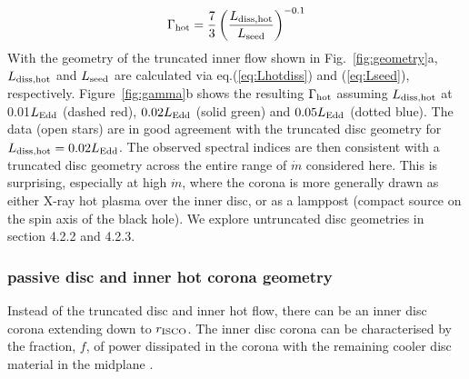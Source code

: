 \documentclass[a4paper,fleqn,usenatbib]{mnras}
\begin{document}
\begin{equation} 
\Gamma_{\rm hot}=\frac{7}{3}\left(\frac{L_{\rm diss, hot}}{L_{\rm  seed}}\right)^{-0.1}
\label{eq:gamma} 
\end{equation} 
With the geometry of
the truncated inner flow shown in Fig.~\ref{fig:geometry}a, $L_{\rm
  diss,hot}$ and $L_{\rm seed}$ are calculated via
eq.(\ref{eq:Lhotdiss}) and (\ref{eq:Lseed}), respectively.
Figure~\ref{fig:gamma}b shows the resulting $\Gamma_{\rm hot}$
assuming $L_{\rm diss, hot}$ at 0.01$L_{\rm Edd}$ (dashed red),
$0.02L_{\rm Edd}$ (solid green) and $0.05L_{\rm Edd}$
(dotted blue). The data (open stars) are in good agreement
with the truncated disc geometry for $L_{\rm diss, hot}=0.02L_{\rm
  Edd}$.
The observed spectral indices are then consistent with a truncated
disc geometry across the entire range of $\dot{m}$ considered here. 
This is surprising, especially at high $\dot{m}$, where the corona is more generally drawn as
either X-ray hot plasma over the inner disc, or as a lamppost (compact
source on the spin axis of the black hole). 
We explore untruncated disc geometries in section 4.2.2 and 4.2.3. 

\subsubsection{passive disc  and inner hot corona geometry}
Instead of the truncated disc and inner hot flow, there can be an inner disc corona extending down to $r_{\rm ISCO}$.
The inner disc corona can be characterised by the fraction, $f$, of
power dissipated in the 
corona with the remaining %
cooler disc material
in the midplane \citep{svensson1994}. 
\end{document}
